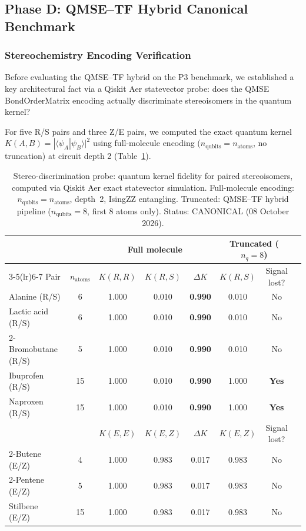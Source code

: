 
\subsection{Phase D: QMSE--TF Hybrid Canonical Benchmark}
\label{sec:phased}

\subsubsection{Stereochemistry Encoding Verification}

Before evaluating the QMSE--TF hybrid on the P3 benchmark, we established a
key architectural fact via a Qiskit Aer statevector probe: does the QMSE
BondOrderMatrix encoding actually discriminate stereoisomers in the quantum
kernel?

For five R/S pairs and three Z/E pairs, we computed the exact quantum kernel
$K(A,B) = |\langle\psi_A|\psi_B\rangle|^2$ using full-molecule encoding
($n_{\text{qubits}} = n_{\text{atoms}}$, no truncation) at circuit depth 2
(Table~\ref{tab:stereo_probe}).

\begin{table}[htbp]
\centering
\caption{Stereo-discrimination probe: quantum kernel fidelity for paired
stereoisomers, computed via Qiskit Aer exact statevector simulation.
Full-molecule encoding: $n_{\text{qubits}} = n_{\text{atoms}}$, depth~2,
IsingZZ entangling.
Truncated: QMSE--TF hybrid pipeline ($n_{\text{qubits}} = 8$, first 8 atoms only).
Status: CANONICAL (08 October 2026).}
\label{tab:stereo_probe}
\begin{tabular}{lccccccc}
\toprule
& & \multicolumn{3}{c}{Full molecule} & \multicolumn{2}{c}{Truncated ($n_q=8$)} \\
\cmidrule(lr){3-5}\cmidrule(lr){6-7}
Pair & $n_{\text{atoms}}$ & $K(R,R)$ & $K(R,S)$ & $\Delta K$ & $K(R,S)$ & Signal lost? \\
\midrule
Alanine (R/S) & 6 & 1.000 & 0.010 & \textbf{0.990} & 0.010 & No \\
Lactic acid (R/S) & 6 & 1.000 & 0.010 & \textbf{0.990} & 0.010 & No \\
2-Bromobutane (R/S) & 5 & 1.000 & 0.010 & \textbf{0.990} & 0.010 & No \\
Ibuprofen (R/S) & 15 & 1.000 & 0.010 & \textbf{0.990} & 1.000 & \textbf{Yes} \\
Naproxen (R/S) & 15 & 1.000 & 0.010 & \textbf{0.990} & 1.000 & \textbf{Yes} \\
\midrule
& & $K(E,E)$ & $K(E,Z)$ & $\Delta K$ & $K(E,Z)$ & Signal lost? \\
\midrule
2-Butene (E/Z) & 4 & 1.000 & 0.983 & 0.017 & 0.983 & No \\
2-Pentene (E/Z) & 5 & 1.000 & 0.983 & 0.017 & 0.983 & No \\
Stilbene (E/Z) & 15 & 1.000 & 0.983 & 0.017 & 0.983 & No \\
\bottomrule
\end{tabular}
\end{table}

